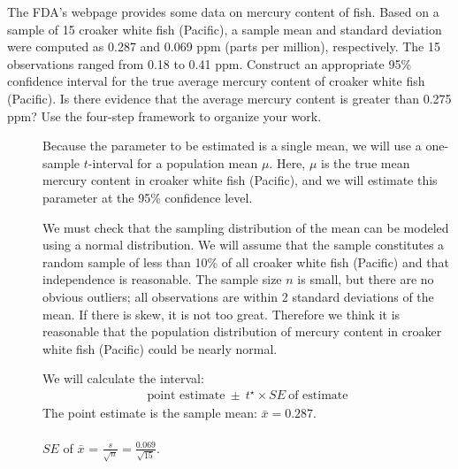 \newpage
\begin{examplewrap}
\begin{nexample}{The FDA's webpage provides some data on mercury content of fish.
    Based on a sample of 15 croaker white fish (Pacific), a sample mean and
    standard deviation were computed as 0.287 and 0.069 ppm (parts per million),
    respectively.
    The 15 observations ranged from 0.18 to 0.41 ppm.
    Construct an appropriate 95\% confidence interval for the true average
    mercury content of croaker white fish (Pacific).
    Is there evidence that the average mercury content is greater than 0.275 ppm?
    Use the four-step framework to organize your work.}
\label{croakerWhiteFishPacificExerConditions}
\begin{description}
\item[] Because the parameter to be estimated is a single mean, we will use a one-sample $t$-interval for a population mean $\mu$.  Here, $\mu$ is the  true mean mercury content in croaker white fish (Pacific), and we will estimate this parameter at the 95\% confidence level.  
\item[] We must check that the sampling distribution of the mean can be modeled using a normal distribution.  We will assume that the sample constitutes a random sample of less than 10\% of all croaker white fish (Pacific) and that independence is reasonable. The sample size $n$ is small, but there are no obvious outliers; all observations are within 2 standard deviations of the mean. If there is skew, it is not too great. Therefore we think it is reasonable that the population distribution of mercury content in croaker white fish (Pacific) could be nearly normal.  
\item[]  We will calculate the interval:
\begin{align*}
\text{point estimate}\ \pm\ t^{\star} \times SE\ \text{of estimate}
\end{align*}
The point estimate is the sample mean: $\bar{x}= 0.287$.\\
\\
$SE$ of $\bar{x}$ = $ \frac{s}{\sqrt{n}} = \frac{0.069}{\sqrt{15}}$. \\


\end{description}
\end{nexample}
\end{examplewrap}
